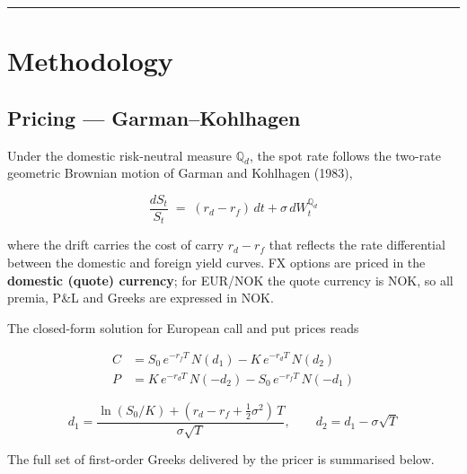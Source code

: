 \documentclass[11pt, a4paper]{article}
\theoremstyle{defstyle}
\begin{document}
\hrule
\vspace{1em}

\section{Methodology}

\subsection{Pricing --- Garman--Kohlhagen}

Under the domestic risk-neutral measure $\mathbb{Q}_d$, the spot rate follows
the two-rate geometric Brownian motion of Garman and Kohlhagen (1983),

\begin{equation}
    \frac{dS_t}{S_t}
    \;=\;
    (r_d - r_f)\,dt + \sigma\,dW_t^{\mathbb{Q}_d}
\end{equation}

where the drift carries the cost of carry $r_d - r_f$ that reflects the rate
differential between the domestic and foreign yield curves.
FX options are priced in the \textbf{domestic (quote) currency};
for EUR/NOK the quote currency is NOK, so all premia, P\&L and Greeks
are expressed in NOK.

The closed-form solution for European call and put prices reads

\begin{align}
    C &= S_0\,e^{-r_f T}\,N(d_1) - K\,e^{-r_d T}\,N(d_2) \\[4pt]
    P &= K\,e^{-r_d T}\,N(-d_2) - S_0\,e^{-r_f T}\,N(-d_1)
\end{align}

\begin{equation}
    d_1 = \frac{\ln(S_0/K) + (r_d - r_f + \tfrac{1}{2}\sigma^2)\,T}{\sigma\sqrt{T}},
    \qquad
    d_2 = d_1 - \sigma\sqrt{T}
\end{equation}

The full set of first-order Greeks delivered by the pricer is summarised below.
\end{document}
